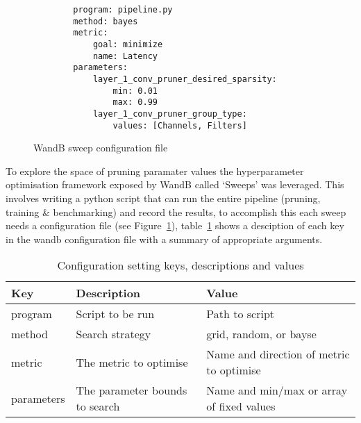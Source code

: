\documentclass[../Dissertation.tex]{subfiles}
\begin{document}
\singlespacing
\begin{figure}[H]
    \begin{verbatim}
        program: pipeline.py
        method: bayes
        metric:
            goal: minimize
            name: Latency
        parameters:
            layer_1_conv_pruner_desired_sparsity:
                min: 0.01
                max: 0.99
            layer_1_conv_pruner_group_type:
                values: [Channels, Filters]
    \end{verbatim}
    \caption{WandB sweep configuration file}
    \label{fig:sweepConfig}
\end{figure}
\doublespacing

To explore the space of pruning paramater values the hyperparameter optimisation framework exposed by WandB called `Sweeps' was leveraged. 
This involves writing a python script that can run the entire pipeline (pruning, training \& benchmarking) and record the results, to accomplish this each sweep needs a configuration file (see Figure~\ref{fig:sweepConfig}), table~\ref{tab:WandBConfig} shows a desciption of each key in the wandb configuration file with a summary of appropriate arguments. 



\begin{table}[H]
    \begin{tabular}{@{}|l|l|l|@{}}
    \toprule
    Key        & Description                    & Value                                    \\ \midrule
    program    & Script to be run               & Path to script                           \\ \midrule
    method     & Search strategy                & grid, random, or bayse                   \\ \midrule
    metric     & The metric to optimise         & Name and direction of metric to optimise \\ \midrule
    parameters & The parameter bounds to search & Name and min/max or array of fixed values  \\ \bottomrule
    \end{tabular}
    \caption{Configuration setting keys, descriptions and values}
    \label{tab:WandBConfig}
\end{table}


\end{document}
